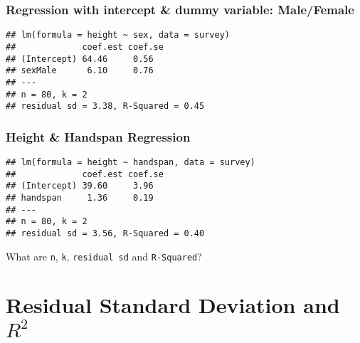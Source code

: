 
\begin{frame}[fragile]
  \frametitle{Regression with intercept \& dummy variable: Male/Female}
\begin{knitrout}
\color{fgcolor}\begin{kframe}
\begin{alltt}
 \hlkwb{<-}  \hlopt{~}   
\end{alltt}
\begin{verbatim}
## lm(formula = height ~ sex, data = survey)
##             coef.est coef.se
## (Intercept) 64.46     0.56  
## sexMale      6.10     0.76  
## ---
## n = 80, k = 2
## residual sd = 3.38, R-Squared = 0.45
\end{verbatim}
\end{kframe}
\end{knitrout}
\end{frame}
\begin{frame}[fragile]
  \frametitle{Height \& Handspan Regression}
\begin{knitrout}
\color{fgcolor}\begin{kframe}
\begin{alltt}
\end{alltt}
\begin{verbatim}
## lm(formula = height ~ handspan, data = survey)
##             coef.est coef.se
## (Intercept) 39.60     3.96  
## handspan     1.36     0.19  
## ---
## n = 80, k = 2
## residual sd = 3.56, R-Squared = 0.40
\end{verbatim}
\end{kframe}
\end{knitrout}
\alert{What are \texttt{n}, \texttt{k}, \texttt{residual sd} and \texttt{R-Squared}?}
\end{frame}
\section{Residual Standard Deviation and $R^2$}

